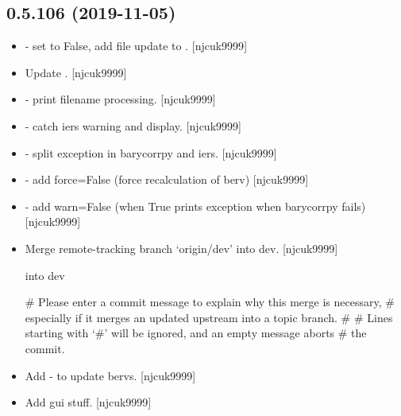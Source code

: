 \documentclass[a4paper,10pt,english]{report}
\begin{document}
\subsection{0.5.106 (2019-11-05)}
\label{\detokenize{misc/changelog:id36}}\begin{itemize}
\item {} 
 - set  to False, add file update to
. {[}njcuk9999{]}

\item {} 
Update . {[}njcuk9999{]}

\item {} 
 - print filename processing. {[}njcuk9999{]}

\item {} 
 - catch iers warning and display. {[}njcuk9999{]}

\item {} 
 - split exception in barycorrpy and iers.
{[}njcuk9999{]}

\item {} 
 - add force=False (force recalculation of
berv) {[}njcuk9999{]}

\item {} 
 - add warn=False (when True prints exception
when barycorrpy fails) {[}njcuk9999{]}

\item {} 
Merge remote-tracking branch ‘origin/dev’ into dev. {[}njcuk9999{]}

 into dev

\# Please enter a commit message to explain why this merge is necessary,
\# especially if it merges an updated upstream into a topic branch.
\#
\# Lines starting with ‘\#’ will be ignored, and an empty message aborts
\# the commit.

\item {} 
Add  - to update bervs. {[}njcuk9999{]}

\item {} 
Add gui stuff. {[}njcuk9999{]}

\end{itemize}
\end{document}
